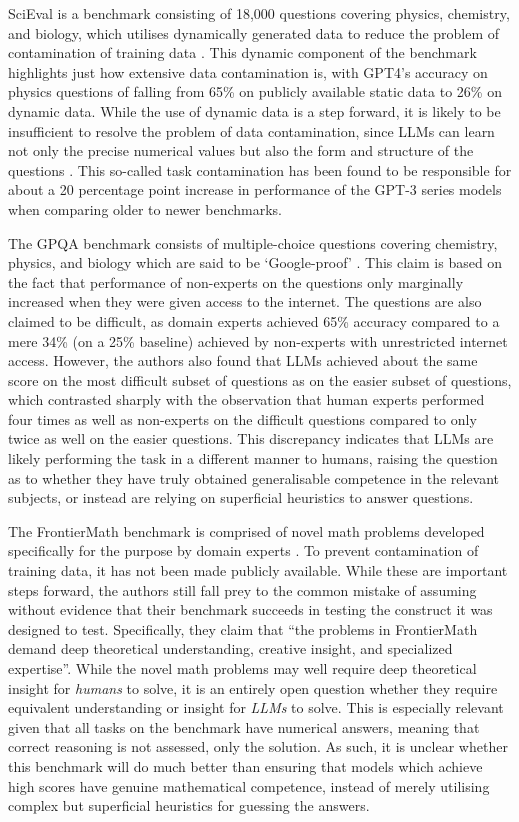 \documentclass{article}
\begin{document}
SciEval is a benchmark consisting of 18,000 questions covering physics, chemistry, and biology, which utilises dynamically generated data to reduce the problem of contamination of training data \citep{sun2024scieval}. This dynamic component of the benchmark highlights just how extensive data contamination is, with GPT4’s accuracy on physics questions of falling from 65\% on publicly available static data to 26\% on dynamic data. While the use of dynamic data is a step forward, it is likely to be insufficient to resolve the problem of data contamination, since LLMs can learn not only the precise numerical values but also the form and structure of the questions \citep{li2024task}. This so-called task contamination has been found to be responsible for about a 20 percentage point increase in performance of the GPT-3 series models when comparing older to newer benchmarks.

The GPQA benchmark consists of multiple-choice questions covering chemistry, physics, and biology which are said to be ‘Google-proof’ \citep{rein2023gpqa}. This claim is based on the fact that performance of non-experts on the questions only marginally increased when they were given access to the internet. The questions are also claimed to be difficult, as domain experts achieved 65\% accuracy compared to a mere 34\% (on a 25\% baseline) achieved by non-experts with unrestricted internet access. However, the authors also found that LLMs achieved about the same score on the most difficult subset of questions as on the easier subset of questions, which contrasted sharply with the observation that human experts performed four times as well as non-experts on the difficult questions compared to only twice as well on the easier questions. This discrepancy indicates that LLMs are likely performing the task in a different manner to humans, raising the question as to whether they have truly obtained generalisable competence in the relevant subjects, or instead are relying on superficial heuristics to answer questions.

The FrontierMath benchmark is comprised of novel math problems developed specifically for the purpose by domain experts \citep{glazer2024frontiermath}. To prevent contamination of training data, it has not been made publicly available. While these are important steps forward, the authors still fall prey to the common mistake of assuming without evidence that their benchmark succeeds in testing the construct it was designed to test. Specifically, they claim that “the problems in FrontierMath demand deep theoretical understanding, creative insight, and specialized expertise”. While the novel math problems may well require deep theoretical insight for \textit{humans} to solve, it is an entirely open question whether they require equivalent understanding or insight for \textit{LLMs} to solve. This is especially relevant given that all tasks on the benchmark have numerical answers, meaning that correct reasoning is not assessed, only the solution. As such, it is unclear whether this benchmark will do much better than ensuring that models which achieve high scores have genuine mathematical competence, instead of merely utilising complex but superficial heuristics for guessing the answers.
\end{document}
